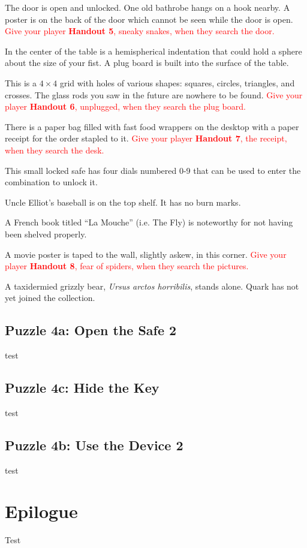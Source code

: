\documentclass[a6paper, parskip=half, DIV=14, 12pt]{scrartcl}
\begin{document}
\begin{description}[leftmargin=0pt]
\item[Door (E)] The door is open and unlocked. One old bathrobe hangs on a hook nearby. A poster is on the back of the door which cannot be seen while the door is open.
\textcolor{Red}{Give your player \textbf{Handout 5}, sneaky snakes, when they search the door.}

\item[Table (C)] In the center of the table is a hemispherical indentation that could hold a sphere about the size of your fist. A plug board is built into the surface of the table.

\item[Plug Board (C)] This is a $4 \times 4$ grid with holes of various shapes: squares, circles, triangles, and crosses. The glass rods you saw in the future are nowhere to be found.
\textcolor{Red}{Give your player \textbf{Handout 6}, unplugged, when they search the plug board.}

\item[Desk (W)] There is a paper bag filled with fast food wrappers on the desktop  with a paper receipt for the order stapled to it.
\textcolor{Red}{Give your player \textbf{Handout 7}, the receipt, when they search the desk.}

\item[Safe (W)] This small locked safe has four dials numbered 0-9 that can be used to enter the combination to unlock it.

\item[Shelves (NW)] Uncle Elliot's baseball is on the top shelf. It has no burn marks.

\item[Bookcases (NE)] A French book titled ``La Mouche'' (i.e. The Fly) is noteworthy for not having been shelved properly.

\item[Pictures (SE)] A movie poster is taped to the wall, slightly askew, in this corner.
\textcolor{Red}{Give your player \textbf{Handout 8}, fear of spiders, when they search the pictures.}

\item[Animals (SW)] A taxidermied grizzly bear, \textit{Ursus arctos horribilis}, stands alone. Quark has not yet joined the collection.

\end{description}

\newpage

\subsection*{Puzzle 4a: Open the Safe 2}
test

\newpage

\subsection*{Puzzle 4c: Hide the Key}
test

\newpage

\subsection*{Puzzle 4b: Use the Device 2}
test

\newpage


\section*{Epilogue}
Test
\end{document}
